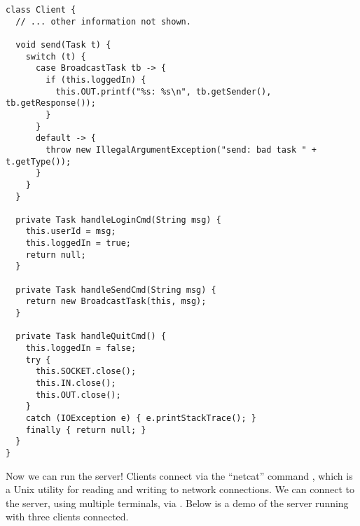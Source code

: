 \begin{lstlisting}[language=MyJava]
class Client {
  // ... other information not shown.

  void send(Task t) {
    switch (t) {
      case BroadcastTask tb -> {
        if (this.loggedIn) { 
          this.OUT.printf("%s: %s\n", tb.getSender(), tb.getResponse()); 
        }
      }
      default -> {
        throw new IllegalArgumentException("send: bad task " + t.getType());
      }
    }
  }

  private Task handleLoginCmd(String msg) {
    this.userId = msg;
    this.loggedIn = true;
    return null;
  }

  private Task handleSendCmd(String msg) {
    return new BroadcastTask(this, msg);
  }

  private Task handleQuitCmd() {
    this.loggedIn = false;
    try {
      this.SOCKET.close();
      this.IN.close();
      this.OUT.close();
    } 
    catch (IOException e) { e.printStackTrace(); }
    finally { return null; }
  }
}
\end{lstlisting}

Now we can run the server! Clients connect via the ``netcat'' command , which is a Unix utility for reading and writing to network connections. We can connect to the server, using multiple terminals, via . Below is a demo of the server running with three clients connected.